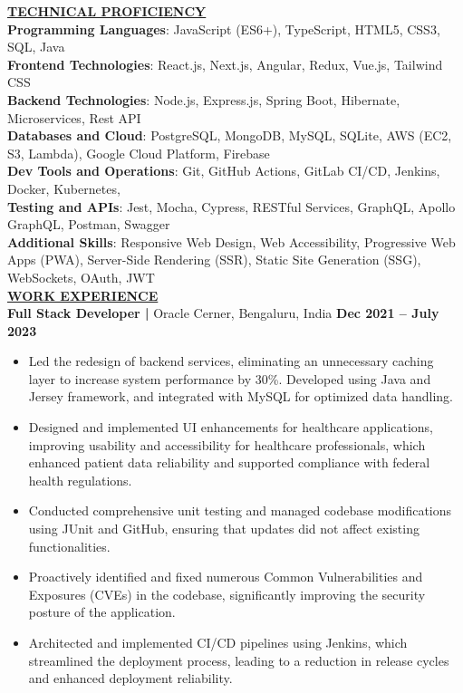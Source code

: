 \documentclass{article}
\begin{document}
\noindent \textbf{\underline{TECHNICAL PROFICIENCY}} \\
\textbf{Programming Languages}{: \small JavaScript (ES6+), TypeScript, HTML5, CSS3, SQL, Java} \\
\textbf{Frontend Technologies}{: \small React.js, Next.js, Angular, Redux, Vue.js, Tailwind CSS} \\
\textbf{Backend Technologies}{: \small Node.js, Express.js, Spring Boot, Hibernate, Microservices, Rest API} \\
\textbf{Databases and Cloud}{: \small PostgreSQL, MongoDB, MySQL, SQLite, AWS (EC2, S3, Lambda), Google Cloud Platform, Firebase} \\
\textbf{Dev Tools and Operations}{: \small Git, GitHub Actions, GitLab CI/CD, Jenkins, Docker, Kubernetes,} \\
\textbf{Testing and APIs}{: \small Jest, Mocha, Cypress, RESTful Services, GraphQL, Apollo GraphQL, Postman, Swagger} \\
\textbf{Additional Skills}{: \small Responsive Web Design, Web Accessibility, Progressive Web Apps (PWA), Server-Side Rendering (SSR), Static Site Generation (SSG), WebSockets, OAuth, JWT} \\




\noindent \textbf{\underline{WORK EXPERIENCE}} \\
\noindent \textbf{Full Stack Developer | } Oracle Cerner, Bengaluru, India  \hfill \textbf{Dec 2021 – July 2023}
\begin{itemize}[noitemsep,nolistsep,leftmargin=*]
\item {\small Led the redesign of backend services, eliminating an unnecessary caching layer to increase system performance by 30\%. Developed using Java and Jersey framework, and integrated with MySQL for optimized data handling.}
\item {\small Designed and implemented UI enhancements for healthcare applications, improving usability and accessibility for healthcare professionals, which enhanced patient data reliability and supported compliance with federal health regulations.}
\item {\small Conducted comprehensive unit testing and managed codebase modifications using JUnit and GitHub, ensuring that updates did not affect existing functionalities.}
\item {\small Proactively identified and fixed numerous Common Vulnerabilities and Exposures (CVEs) in the codebase, significantly improving the security posture of the application.}
\item {\small Architected and implemented CI/CD pipelines using Jenkins, which streamlined the deployment process, leading to a reduction in release cycles and enhanced deployment reliability.}\\
\end{itemize}
\end{document}
